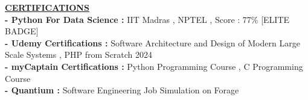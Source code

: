 \documentclass{article}
\begin{document}
\noindent \textbf{\underline{CERTIFICATIONS}} \\
\noindent \textbf{- Python For Data Science :} IIT Madras , NPTEL , Score : 77\% [ELITE BADGE] \\
\noindent \textbf{- Udemy Certifications :} Software Architecture and Design of Modern Large Scale Systems , PHP from Scratch 2024 \\
\noindent \textbf{- myCaptain Certifications :} Python Programming Course , C Programming Course \\
\noindent \textbf{- Quantium :} Software Engineering Job Simulation on Forage
\end{document}
